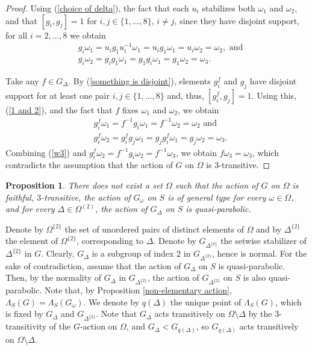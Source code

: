 \documentclass[11pt,letterpaper]{article}
\newtheorem{prop}[thm]{Proposition}
\theoremstyle{definition}
\theoremstyle{remark}
\begin{document}
\begin{proof}
Using (\ref{choice of delta}), the fact that each $u_i$ stabilizes both $\omega_1$ and $\omega_2$, and that $[g_i, g_j]=1$ for $i,j \in \{1, \dots, 8\}, \, i\neq j$, since they have disjoint support, for all $i=2,\dots, 8$ we obtain
\begin{equation}\label{1 and 2}
    \begin{aligned}
    &g_i\omega_1=u_ig_1u_i^{-1}\omega_1=u_ig_1\omega_1=u_i\omega_2=\omega_2, \text{ and}\\
    &g_i\omega_2=g_ig_1\omega_1=g_1g_i\omega_1=g_1\omega_2=\omega_3.
    \end{aligned}
\end{equation}

Take any $f \in G_\Delta$. 
By (\ref{something is disjoint}), elements $g_i^f$ and $g_j$ have disjoint support for at least one pair $i,j \in \{1,\dots, 8\}$ and, thus, $
[g_i^f,g_j]=1$.
Using this, (\ref{1 and 2}), and the fact that $f$ fixes $\omega_1$ and $\omega_2$, we obtain
\begin{equation}\label{w3}
\begin{aligned}
&g_i^f\omega_1=f^{-1}g_i\omega_1=f^{-1}\omega_2=\omega_2 \text{ and }\\
&g_i^f\omega_2 =g_i^fg_j\omega_1=g_jg_i^f\omega_1=g_j\omega_2 =\omega_3.
\end{aligned}
\end{equation}
Combining (\ref{w3}) and $g_i^f\omega_2=f^{-1}g_i\omega_2=f^{-1}\omega_3$, we obtain
$ f\omega_3=\omega_3$, which contradicts the assumption that the action of $G$ on $\Omega$ is $3$-transitive.
\end{proof}

\begin{prop}\label{Stab Delta is not quasi-parabolic}
    There does not exist a set $\Omega$ such that the action of $G$ on $\Omega$ is faithful, $3$-transitive, the action of $G_\omega$ on $S$ is of general type for every $\omega \in \Omega$, and for every $\Delta \in \Omega^{(2)}$, the action of $G_\Delta$ on $S$ is quasi-parabolic. 
\end{prop}

   Denote by $\Omega^{\{2\}}$ the set of unordered pairs of distinct elements of $\Omega$ and by $\Delta^{\{2\}}$ the element of $\Omega^{\{2\}}$, corresponding to $\Delta$. 
   Denote by  $G_{\Delta^{\{2\}}}$  the setwise stabilizer of $\Delta^{\{2\}}$ in $G$. Clearly, $G_\Delta$ is a subgroup of index $2$ in $G_{\Delta^{\{2\}}}$, hence is normal. For the sake of contradiction, assume that the action of $G_\Delta$ on $S$ is quasi-parabolic. Then, by the normality of $G_\Delta$ in $G_{\Delta^{\{2\}}}$, the action of $G_{\Delta^{\{2\}}}$ on $S$ is also quasi-parabolic. Note that, by Proposition \ref{non-elementary action}, $\Lambda_S(G)=\Lambda_S(G_\omega)$. We denote by $q(\Delta)$ the unique point of $\Lambda_S(G)$, which is fixed by $G_\Delta$ and $G_{\Delta^{\{2\}}}$. Note that $G_{\Delta}$ acts transitively on  $\Omega\setminus \Delta$ by the $3$-transitivity of the $G$-action on $\Omega$, and $G_{\Delta} < G_{q(\Delta)}$, so $G_{q(\Delta)}$ acts transitively on $\Omega \setminus  \Delta $.
  
\end{document}
